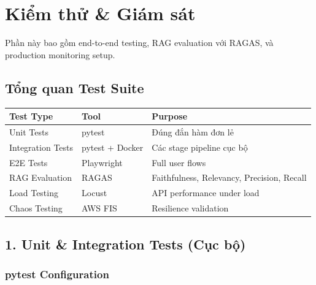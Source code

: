 \hypertarget{kiux1ec3m-thux1eed-giuxe1m-suxe1t}{%
\section{Kiểm thử \& Giám sát}}

Phần này bao gồm end-to-end testing, RAG evaluation với RAGAS, và
production monitoring setup.

\hypertarget{tux1ed5ng-quan-test-suite}{%
\subsection{Tổng quan Test Suite}}

\begingroup
\small
\setlength{\tabcolsep}{3pt}
\renewcommand{\arraystretch}{1.15}
\begin{longtable}[]{@{}lll@{}}
\toprule\noalign{}
Test Type & Tool & Purpose \\
\midrule\noalign{}
\endhead
\bottomrule\noalign{}
\endlastfoot
Unit Tests & pytest & Đúng đắn hàm đơn lẻ \\
Integration Tests & pytest + Docker & Các stage pipeline cục bộ \\
E2E Tests & Playwright & Full user flows \\
RAG Evaluation & RAGAS & Faithfulness, Relevancy, Precision, Recall \\
Load Testing & Locust & API performance under load \\
Chaos Testing & AWS FIS & Resilience validation \\
\end{longtable}
\endgroup

\hypertarget{unit-integration-tests-cux1ee5c-bux1ed9}{%
\subsection{1. Unit \& Integration Tests (Cục
bộ)}}

\hypertarget{pytest-configuration}{%
\subsubsection{pytest Configuration}}

\begin{Shaded}
\begin{Highlighting}[]
\KeywordTok{[pytest]}
\OtherTok{=}
\OtherTok{=}
\OtherTok{=}
\OtherTok{=}
\OtherTok{=}
\end{Highlighting}
\end{Shaded}

